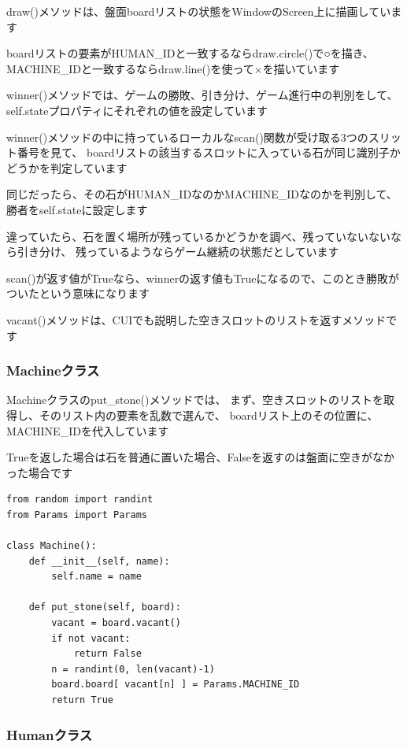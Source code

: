 \documentclass[uplatex,a4paper,11pt,oneside,openany]{jsbook}
\begin{document}
draw()メソッドは、盤面boardリストの状態をWindowのScreen上に描画しています

boardリストの要素がHUMAN\_IDと一致するならdraw.circle()で○を描き、
MACHINE\_IDと一致するならdraw.line()を使って×を描いています

winner()メソッドでは、ゲームの勝敗、引き分け、ゲーム進行中の判別をして、
self.stateプロパティにそれぞれの値を設定しています

winner()メソッドの中に持っているローカルなscan()関数が受け取る3つのスリット番号を見て、
boardリストの該当するスロットに入っている石が同じ識別子かどうかを判定しています

同じだったら、その石がHUMAN\_IDなのかMACHINE\_IDなのかを判別して、勝者をself.stateに設定します

違っていたら、石を置く場所が残っているかどうかを調べ、残っていないないなら引き分け、
残っているようならゲーム継続の状態だとしています

scan()が返す値がTrueなら、winnerの返す値もTrueになるので、このとき勝敗がついたという意味になります

vacant()メソッドは、CUIでも説明した空きスロットのリストを返すメソッドです

\subsubsection{Machineクラス}

Machineクラスのput\_stone()メソッドでは、
まず、空きスロットのリストを取得し、そのリスト内の要素を乱数で選んで、
boardリスト上のその位置に、MACHINE\_IDを代入しています

Trueを返した場合は石を普通に置いた場合、Falseを返すのは盤面に空きがなかった場合です

\begin{lstlisting}[caption=class Machine,label=prog05-1]
from random import randint
from Params import Params

class Machine():
    def __init__(self, name):
        self.name = name

    def put_stone(self, board):
        vacant = board.vacant()
        if not vacant:
            return False
        n = randint(0, len(vacant)-1)
        board.board[ vacant[n] ] = Params.MACHINE_ID
        return True
\end{lstlisting}%

\subsubsection{Humanクラス}
\end{document}
